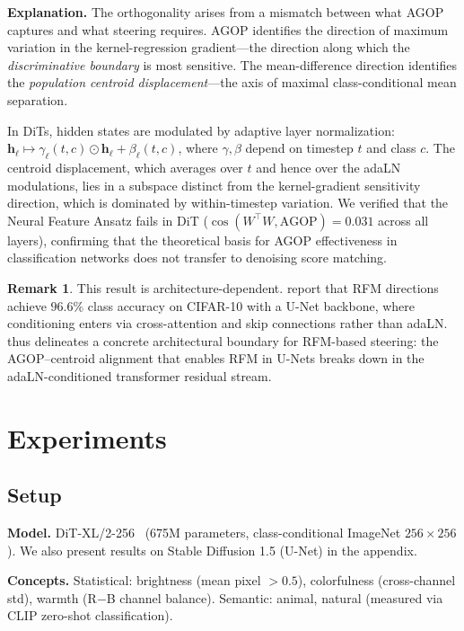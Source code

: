 \documentclass{article}
\theoremstyle{definition}
\newtheorem{remark}[theorem]{Remark}
\newcommand{\bh}{\mathbf{h}}
\begin{document}
\textbf{Explanation.}
The orthogonality arises from a mismatch between what AGOP captures and what steering requires.
AGOP identifies the direction of maximum variation in the kernel-regression gradient---the direction along which the \emph{discriminative boundary} is most sensitive.
The mean-difference direction identifies the \emph{population centroid displacement}---the axis of maximal class-conditional mean separation.

In DiTs, hidden states are modulated by adaptive layer normalization: $\bh_\ell \mapsto \gamma_\ell(t,c) \odot \bh_\ell + \beta_\ell(t,c)$, where $\gamma, \beta$ depend on timestep $t$ and class $c$.
The centroid displacement, which averages over $t$ and hence over the adaLN modulations, lies in a subspace distinct from the kernel-gradient sensitivity direction, which is dominated by within-timestep variation.
We verified that the Neural Feature Ansatz fails in DiT ($\cos(W^\top W, \mathrm{AGOP}) = 0.031$ across all layers), confirming that the theoretical basis for AGOP effectiveness in classification networks does not transfer to denoising score matching.

\begin{remark}
This result is architecture-dependent.
\citet{wang2026general} report that RFM directions achieve $96.6\%$ class accuracy on CIFAR-10 with a U-Net backbone, where conditioning enters via cross-attention and skip connections rather than adaLN.
 thus delineates a concrete architectural boundary for RFM-based steering: the AGOP--centroid alignment that enables RFM in U-Nets breaks down in the adaLN-conditioned transformer residual stream.
\end{remark}

\section{Experiments}
\label{sec:exp}

\subsection{Setup}

\textbf{Model.} DiT-XL/2-256~\citep{peebles2023scalable} (675M parameters, class-conditional ImageNet $256 \times 256$).
We also present results on Stable Diffusion 1.5 (U-Net) in the appendix.

\textbf{Concepts.} Statistical: brightness (mean pixel $> 0.5$), colorfulness (cross-channel std), warmth (R$-$B channel balance).
Semantic: animal, natural (measured via CLIP zero-shot classification).
\end{document}
